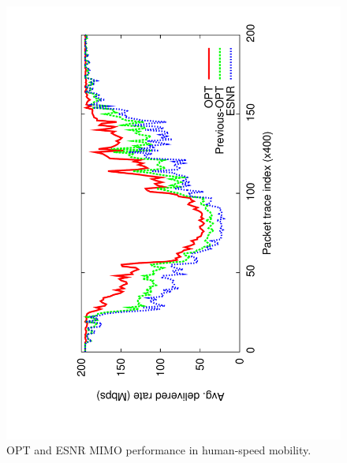 \begin{figure}[t]
      \centering
      \includegraphics[angle=-90,viewport=125 68 491 760,clip,width=.95\columnwidth]{figures/esnr/mimo_skip_time.pdf}
      \vspace{-2pt}
      \caption{\label{fig:mimo_eff_snr_time} OPT and ESNR MIMO performance in human-speed mobility.}
\end{figure}

